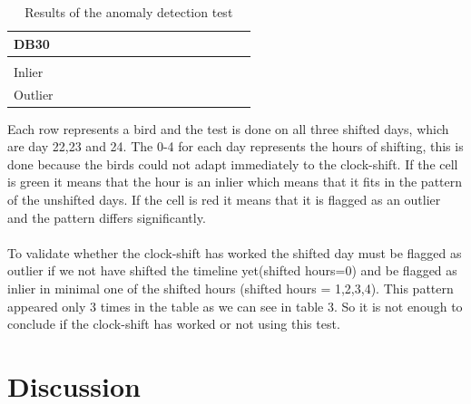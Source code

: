\documentclass[a4paper]{article}
\begin{document}
\begin{table}[H]
\begin{tabular}{llllllllllllllll}
\multicolumn{1}{|l|}{\textbf{DB30}} & \multicolumn{1}{l|}{\cellcolor[HTML]{FD6864}} & \multicolumn{1}{l|}{\cellcolor[HTML]{FD6864}} & \multicolumn{1}{l|}{\cellcolor[HTML]{FD6864}} & \multicolumn{1}{l|}{\cellcolor[HTML]{FD6864}} & \multicolumn{1}{l|}{\cellcolor[HTML]{FD6864}} & \multicolumn{1}{l|}{\cellcolor[HTML]{FD6864}} & \multicolumn{1}{l|}{\cellcolor[HTML]{FD6864}} & \multicolumn{1}{l|}{\cellcolor[HTML]{FD6864}} & \multicolumn{1}{l|}{\cellcolor[HTML]{FD6864}} & \multicolumn{1}{l|}{\cellcolor[HTML]{FD6864}} & \multicolumn{1}{l|}{\cellcolor[HTML]{FD6864}} & \multicolumn{1}{l|}{\cellcolor[HTML]{FD6864}} & \multicolumn{1}{l|}{\cellcolor[HTML]{FD6864}} & \multicolumn{1}{l|}{\cellcolor[HTML]{FD6864}} & \multicolumn{1}{l|}{\cellcolor[HTML]{FD6864}} \\ \hline
\multicolumn{16}{l}{} \\ \hline
\multicolumn{1}{|l|}{Inlier} & \multicolumn{15}{l|}{\cellcolor[HTML]{67FD9A}} \\ \hline
\multicolumn{1}{|l|}{Outlier} & \multicolumn{15}{l|}{\cellcolor[HTML]{FD6864}} \\ \hline
\end{tabular}
\caption{Results of the anomaly detection test}
\label{my-label}
\end{table}
Each row represents a bird and the test is done on all three shifted days, which are day 22,23 and 24. The 0-4 for each day represents the hours of shifting, this is done because the birds could not adapt immediately to the clock-shift. If the cell is green it means that the hour is an inlier which means that it fits in the pattern of the unshifted days. If the cell is red it means that it is flagged as an outlier and the pattern differs significantly.\\\\
To validate whether the clock-shift has worked the shifted day must be flagged as outlier if we not have shifted the timeline yet(shifted hours=0) and be flagged as inlier in minimal one of the shifted hours (shifted hours = 1,2,3,4). This pattern appeared only 3 times in the table as we can see in table 3. So it is not enough to conclude if the clock-shift has worked or not using this test. 


\section*{Discussion}
\end{document}
